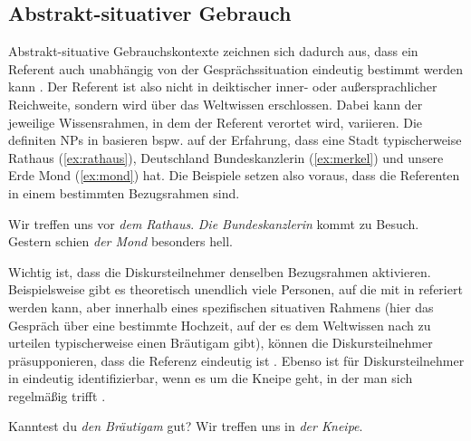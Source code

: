 \subsection{Abstrakt-situativer Gebrauch}\label{sec:abst-sit}

Abstrakt-situative  Gebrauchskontexte zeichnen sich dadurch aus, dass ein Referent auch unabhängig von der Gesprächssituation eindeutig bestimmt werden kann \parencite[daher auch , vgl.][115]{Hawkins1978}. Der  Referent ist also nicht in deiktischer inner- oder außersprachlicher Reichweite, sondern wird über das Weltwissen erschlossen. Dabei kann der jeweilige Wissensrahmen, in dem der Referent verortet wird, variieren. Die definiten NPs  in  basieren bspw. auf der Erfahrung, dass eine Stadt typischerweise  Rathaus (\ref{ex:rathaus}),  Deutschland   Bundeskanzlerin (\ref{ex:merkel})  und unsere Erde  Mond (\ref{ex:mond}) hat. Die Beispiele setzen also voraus, dass die Referenten  in einem bestimmten Bezugsrahmen  \parencite{Russell2006} sind. 

 \begin{exe}
	\ex \label{ex:abstrakt-situativ}   
	\begin{xlist}
		\ex \label{ex:rathaus} Wir treffen uns vor \textit{dem Rathaus}.
		\ex \label{ex:merkel} \textit{Die Bundeskanzlerin} kommt zu Besuch.
		\ex \label{ex:mond} Gestern schien \textit{der Mond} besonders hell.
		\end{xlist}
\end{exe}

Wichtig ist, dass die Diskursteilnehmer denselben Bezugsrahmen aktivieren. Beispielsweise gibt es theoretisch unendlich viele Personen, auf die mit  in  referiert werden kann, aber innerhalb eines spezifischen situativen Rahmens (hier das Gespräch über eine bestimmte Hochzeit, auf der es dem Weltwissen nach zu urteilen typischerweise einen Bräutigam gibt), können die Diskursteilnehmer präsupponieren, dass die Referenz eindeutig ist \parencite[Beispiel in Adaption an][41]{Studler2011}. Ebenso ist für Diskursteilnehmer  in  eindeutig identifizierbar, wenn es um die Kneipe geht, in der man sich regelmäßig trifft \parencite[36]{Himmelmann1997}.

\begin{exe}
	\ex \label{ex:abstrakt-situativ2}   
	\begin{xlist}
		\ex \label{ex:braut} Kanntest du \textit{den Bräutigam} gut?
		\ex \label{ex:kneipe} Wir treffen uns in \textit{der Kneipe}.  
		\end{xlist}
\end{exe}

